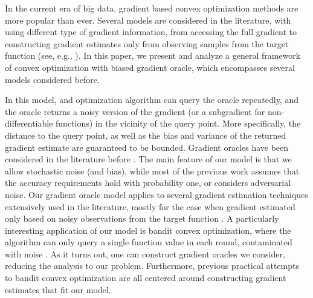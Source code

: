 In the current era of big data, gradient based convex optimization methods are more popular than ever. Several models are considered in the literature, with using different type of gradient information, from accessing the full gradient to constructing gradient estimates only from observing samples from the target function (see, e.g., \citealp{nesterov2004introductory,DeGliNe14,HaLe14:SOC,PoTsy90,flaxman2005online,AbHaRa08,AgDeXi10,Ne11:TR,AgFoHsuKaRa13:SIAM,katkul,kushcla,spall1992multivariate,spall1997one,Dip03:AoS,bhatnagar-book,duchi2015optimal}). In this paper, we present and analyze a general framework of convex optimization with biased gradient oracle, which encompasses several models considered before.

In this model, and optimization algorithm can query the oracle repeatedly, and the oracle returns a noisy version of the gradient (or a subgradient for non-differentiable functions) in the vicinity of the query point. More specifically, the distance to the query point, as well as the bias and variance of the returned gradient estimate are guaranteed to be bounded. Gradient oracles have been considered in the literature before \citep{dAsp08,Baes09,SchRoBa11,DeGliNe14}. The main feature of our model is that we allow stochastic noise (and bias), while most of the previous work assumes that the accuracy requirements hold with probability one, or considers adversarial noise. Our gradient oracle model applies to several gradient estimation techniques extensively used in the literature, mostly for the case when gradient estimated only based on noisy observations from the target function \citep{katkul,kushcla,spall1992multivariate,spall1997one,Dip03:AoS,bhatnagar-book,duchi2015optimal}. A particularly interesting application of our model is bandit convex optimization, where the algorithm can only query a single function value in each round, contaminated with noise \citep{PoTsy90,flaxman2005online,AbHaRa08,AgDeXi10,Ne11:TR,AgFoHsuKaRa13:SIAM,HaLe14:SOC}. As it turns out, one can construct gradient oracles we consider, reducing the analysis to our problem. Furthermore, previous practical attempts to bandit convex optimization are all centered around constructing gradient estimates that fit our model.

